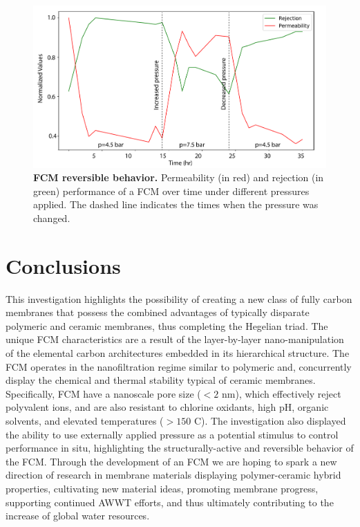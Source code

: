 \begin{figure}[h!]
  \centering
  \includegraphics[width=5in]{paper5/Fig5.pdf}
  \caption{\textbf{FCM reversible behavior.} Permeability (in red) and rejection (in green) performance of a FCM over time under different pressures applied. The dashed line indicates the times when the pressure was changed.}
  \label{Fig5_pap5}
\end{figure}


\section{Conclusions}
This investigation highlights the possibility of creating a new class of fully carbon membranes that possess the combined advantages of typically disparate polymeric and ceramic membranes, thus completing the Hegelian triad. The unique FCM characteristics are a result of the layer-by-layer nano-manipulation of the elemental carbon architectures embedded in its hierarchical structure.  The FCM operates in the nanofiltration regime similar to polymeric and, concurrently display the chemical and thermal stability typical of ceramic membranes. Specifically, FCM have a nanoscale pore size ($<2$ nm), which effectively reject polyvalent ions, and are also resistant to chlorine oxidants, high pH, organic solvents, and elevated temperatures ($>150$ \textdegree C). The investigation also displayed the ability to use externally applied pressure as a potential stimulus to control performance in situ, highlighting the structurally-active and reversible behavior of the FCM. Through the development of an FCM we are hoping to spark a new direction of research in membrane materials displaying polymer-ceramic hybrid properties, cultivating new material ideas, promoting membrane progress, supporting continued AWWT efforts, and thus ultimately contributing to the increase of global water resources.
